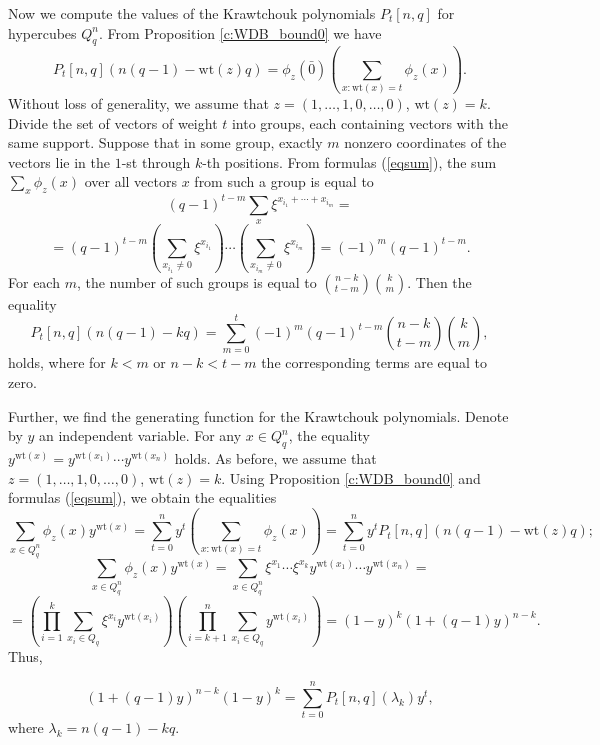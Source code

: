 \documentclass[11pt]{article}
\theoremstyle{definition}
\begin{document}
{{{Now we compute the values of the Krawtchouk polynomials $P_t[n,q]$ for hypercubes
$Q_q^n$. From Proposition \ref{c:WDB_bound0} we have
$$P_t[n,q](n(q-1)-\mathrm{wt}(z)q)=\phi_z(\bar{0})
\left(\sum\limits_{x:\mathrm{wt}(x)=t}\phi_z(x)\right).$$ Without
loss of generality, we assume that $z=(1,\dots,1,0,\dots,0)$,
$\mathrm{wt}(z)=k$. Divide the set of vectors of weight $t$ into groups,
each containing vectors with the same support. Suppose that in some
group, exactly $m$ nonzero coordinates of the vectors lie in the
$1$-st through $k$-th positions. From formulas
(\ref{eqsum}), the sum $\sum_x\phi_z(x)$ over all vectors $x$ from such
a group is equal to $$(q-1)^{t-m}\sum\limits_{x}\xi^{x_{i_1}+\cdots+
x_{i_m}}=$$ $$=(q-1)^{t-m}\left(\sum\limits_{x_{i_1}\neq
0}\xi^{x_{i_1}}\right)\cdots \left(\sum\limits_{x_{i_m}\neq
0}\xi^{x_{i_m}}\right)=(-1)^m(q-1)^{t-m}.$$ For each $m$, the number of such
groups is equal to ${{n-k}\choose{t-m}}{{k}\choose{m}}$.
Then the equality
$$P_t[n,q](n(q-1)-kq)=
\sum\limits_{m=0}^t
(-1)^m(q-1)^{t-m}{{n-k}\choose{t-m}}{{k}\choose{m}},
$$ holds, where for $k< m$ or
$ n-k<t-m$ the corresponding terms are equal to zero.

Further, we find the generating function for the Krawtchouk polynomials. Denote
by $y$ an independent variable. For any $x\in Q^n_q$, the equality
$y^{\mathrm{wt}(x)}=y^{\mathrm{wt}(x_1)}\cdots y^{\mathrm{wt}(x_n)}$ holds. As before,
we assume that $z=(1,\dots,1,0,\dots,0)$, $\mathrm{wt}(z)=k$.
Using Proposition \ref{c:WDB_bound0} and formulas (\ref{eqsum}),
we obtain the equalities
$$\sum\limits_{x\in Q^n_q}\phi_z(x)y^{\mathrm{wt}(x)}=
\sum\limits_{t=0}^ny^t\left(\sum\limits_{x:\mathrm{wt}(x)=t}\phi_z(x)\right)=
\sum\limits_{t=0}^ny^tP_t[n,q](n(q-1)-\mathrm{wt}(z)q);$$
$$\sum\limits_{x\in Q^n_q}\phi_z(x)y^{\mathrm{wt}(x)}=\sum\limits_{x\in Q^n_q}
\xi^{x_1}\cdots\xi^{x_k}y^{\mathrm{wt}(x_1)}\cdots y^{\mathrm{wt}(x_n)}=$$ $$=
\left(\prod\limits_{i=1}^{k}\sum\limits_{x_i\in
Q_q}\xi^{x_i}y^{\mathrm{wt}(x_i)}\right)
\left(\prod\limits_{i=k+1}^{n}\sum\limits_{x_i\in
Q_q}y^{\mathrm{wt}(x_i)}\right)=(1-y)^k(1+(q-1)y)^{n-k}.$$ Thus,

\begin{equation}\label{eqKraw}
(1+(q-1)y)^{n-k}(1-y)^k=
\sum\limits_{t=0}^n P_t[n,q](\lambda_k)y^t,
\end{equation} where
$\lambda_k=n(q-1)-kq$.

}}}
\end{document}
